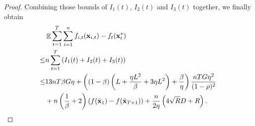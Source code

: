 \documentclass{article}
\begin{document}
\begin{proof}
Combining those bounds of $I_1(t)$, $I_2(t)$ and $I_3(t)$ together, we finally obtain
\begin{align}
\nonumber
& \mathop{\mathbb{E}} \sum_{t=1}^T\sum_{i=1}^n f_{i,t}({\bf x}_{i,t}) - f_t({\bf x}_t^\ast) \\ \nonumber
\le & n \sum_{t=1}^T \left(  I_1(t) + I_2(t) + I_3(t)  \right) \\ \nonumber
\le & 13nT\beta G \eta + \left(  (1-\beta)  \left(  L + \frac{\eta L^2}{\beta} + 3\eta L^2  \right) + \frac{\beta}{\eta}  \right) \frac{nT G \eta^2}{(1-\rho)^2} \\ \nonumber 
&+ n\left( \frac{1}{\beta} + 2 \right)\left( f(\bar{{\bf x}}_1) - f(\bar{{\bf x}}_{T+1}) \right)   + \frac{n}{2\eta}\left(  4\sqrt{R}D + R   \right).
\end{align} 












\end{proof}
\end{document}
